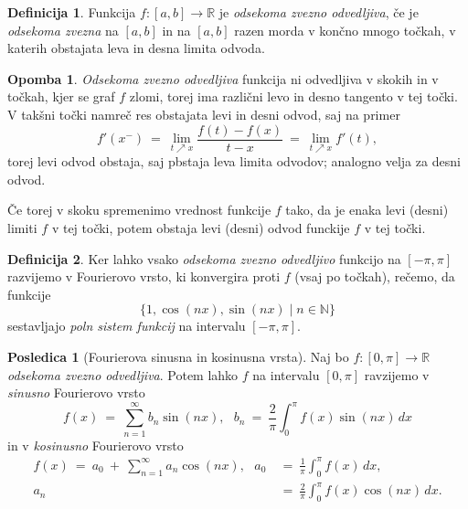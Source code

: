 \documentclass[11pt]{article}
\theoremstyle{definition}
\newtheorem{definicija}{Definicija}[section]
\theoremstyle{definition}
\theoremstyle{definition}
\theoremstyle{theorem}
\newtheorem*{posledica}{Posledica}
\newtheorem*{opomba}{Opomba}
\begin{document}
\begin{definicija}

Funkcija $f:[a, b] \rightarrow \mathbb{R}$ je \textit{odsekoma zvezno odvedljiva}, če je \textit{odsekoma zvezna} na $[a, b]$ in  na $[a, b]$ razen morda v končno mnogo točkah, v katerih obstajata leva in desna limita odvoda.

\end{definicija}
\vspace{0.5cm}

\begin{opomba}

\textit{Odsekoma zvezno odvedljiva} funkcija ni odvedljiva v skokih in v točkah, kjer se graf $f$ zlomi, torej ima različni levo in desno tangento v tej točki. V takšni točki namreč res obstajata levi in desni odvod, saj na primer 
$$f'(x^-) ~=~ \lim_{t \nearrow x} \frac{f(t) - f(x)}{t-x} ~=~ \lim_{t \nearrow x} f'(t),$$
torej levi odvod obstaja, saj pbstaja leva limita odvodov; analogno velja za desni odvod.

Če torej v skoku spremenimo vrednost funkcije $f$ tako, da je enaka levi (desni) limiti $f$ v tej točki, potem obstaja levi (desni) odvod funckije $f$ v tej točki.

\end{opomba}
\vspace{0.5cm}

\begin{definicija}

Ker lahko vsako \textit{odsekoma zvezno odvedljivo} funkcijo na $[-\pi, \pi]$ razvijemo v Fourierovo vrsto, ki konvergira proti $f$ (vsaj po točkah), rečemo, da funkcije 
$$ \{ 1, \cos(nx), \sin(nx) \mid n \in \mathbb{N} \}$$
sestavljajo \textit{poln sistem funkcij} na intervalu $[-\pi, \pi]$.

\end{definicija}
\vspace{0.5cm}

\begin{posledica}[Fourierova sinusna in kosinusna vrsta]

Naj bo $f:[0, \pi] \rightarrow \mathbb{R}$ \textit{odsekoma zvezno odvedljiva}. Potem lahko $f$ na intervalu $[0, \pi]$ ravzijemo v \textit{sinusno} Fourierovo vrsto
$$f(x) ~=~ \sum_{n=1}^{\infty} b_n \sin(nx), ~~~b_n ~=~ \frac{2}{\pi} \int_{0}^{\pi} f(x) \sin(nx)\,dx$$
in v \textit{kosinusno} Fourierovo vrsto
\begin{align*}
f(x) ~=~ a_0 ~+~ \sum_{n=1}^{\infty} a_n \cos(nx), ~~~a_0 ~&=~ \frac{1}{\pi} \int_{0}^{\pi} f(x)\,dx, \\ a_n ~&=~ \frac{2}{\pi} \int_{0}^{\pi} f(x) \cos(nx)\,dx.
\end{align*}

\end{posledica}
\vspace{0.5cm}
\end{document}

